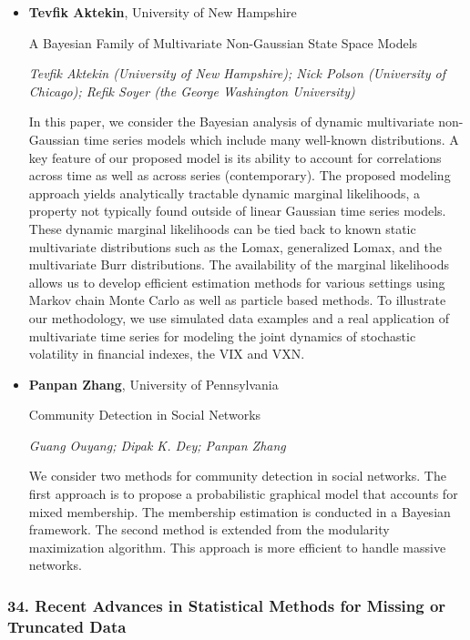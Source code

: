 \begin{itemize}
\item \textbf{Tevfik Aktekin}, University of New Hampshire

A Bayesian Family of Multivariate Non-Gaussian State Space Models

\emph{\footnotesize Tevfik Aktekin (University of New Hampshire); Nick Polson (University of Chicago); Refik Soyer (the George Washington University)}

In this paper, we consider the Bayesian analysis of dynamic multivariate non-Gaussian time series models which include many well-known distributions. A key feature of our proposed model is its ability to account for correlations across time as well as across series (contemporary). The proposed modeling approach yields analytically tractable dynamic marginal likelihoods, a property not typically found outside of linear Gaussian time series models. These dynamic marginal likelihoods can be tied back to known static multivariate distributions such as the Lomax, generalized Lomax, and the multivariate Burr distributions. The availability of the marginal likelihoods allows us to develop efficient estimation methods for various settings using Markov chain Monte Carlo as well as particle based methods. To illustrate our methodology, we use simulated data examples and a real application of multivariate time series for modeling the joint dynamics of stochastic volatility in financial indexes, the VIX and VXN.

\item \textbf{Panpan Zhang}, University of Pennsylvania

Community Detection in Social Networks

\emph{\footnotesize Guang Ouyang; Dipak K. Dey; Panpan Zhang}

We consider two methods for community detection in social networks. The first approach is to propose a probabilistic graphical model that accounts for mixed membership. The membership estimation is conducted in a Bayesian framework. The second method is extended from the modularity maximization algorithm. This approach is more efficient to handle massive networks.

\end{itemize}

\subsubsection*{34. Recent Advances in Statistical Methods for Missing or Truncated Data}

